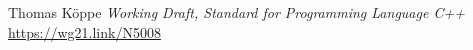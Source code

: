 \documentclass{wg21}
\begin{document}



\renewcommand{\section}[2]{}%

\begin{thebibliography}{9}



Thomas Köppe
\emph{Working Draft, Standard for Programming Language C++}\newline
\url{https://wg21.link/N5008}


\end{thebibliography}
\end{document}
